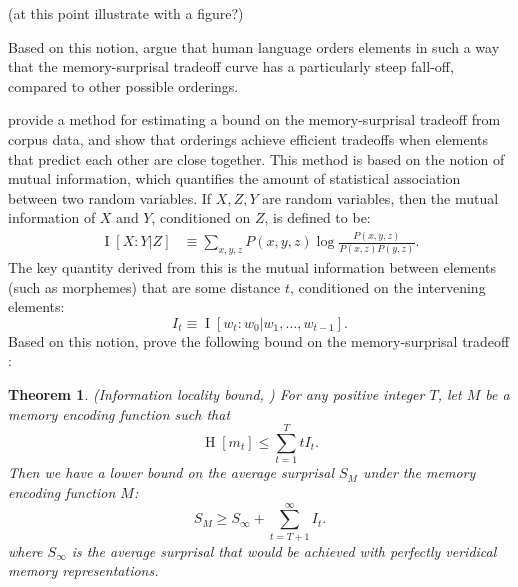 \documentclass[11pt,letterpaper]{article}
\newcommand{\citet}{\Textcite}
\newcommand\mhahn[1]{{\color{red}(#1)}}
\newcounter{theorem}
\newcounter{def}
\newtheorem{thm}[theorem]{Theorem}
\begin{document}
\mhahn{at this point illustrate with a figure?}

Based on this notion, \citet{Hahn2020modeling} argue that human language orders elements in such a way that the memory-surprisal tradeoff curve has a particularly steep fall-off, compared to other possible orderings.


\citet{Hahn2020modeling} provide a method for estimating a bound on the memory-surprisal tradeoff from corpus data, and show that orderings achieve efficient tradeoffs when elements that predict each other are close together.
This method is based on the notion of mutual information, which quantifies the amount of statistical association between two random variables.
If $X, Z, Y$ are random variables, then the mutual information of $X$ and $Y$, conditioned on $Z$, is defined to be:
\begin{align}
\label{eq:mi}
    \operatorname{I}[X:Y|Z] &\equiv \sum_{x,y,z} P(x,y,z) \log \frac{P(x,y,z)}{P(x,z)P(y,z)}. %
\end{align}
The key quantity derived from this is the mutual information between elements (such as morphemes) that are some distance $t$, conditioned on the intervening elements:
\begin{equation*}
    I_t \equiv \operatorname{I}[w_t : w_0 | w_1, \dots, w_{t-1}].
\end{equation*}
Based on this notion, \citet{Hahn2020modeling}  prove the following bound on the memory-surprisal tradeoff :
\begin{thm}\label{prop:suboptimal}(Information locality bound, \citet{Hahn2020modeling})
For any positive integer $T$, let $M$ be a memory encoding function such that
\begin{equation}
\label{eq:memory-bound}
\operatorname{H}[m_t] \le \sum_{t=1}^T t I_t.
\end{equation}
Then we have a lower bound on the average surprisal $S_M$ under the memory encoding function $M$:
\begin{equation}
\label{eq:surprisal-bound}
S_M \ge S_\infty + \sum_{t=T+1}^\infty I_t.
\end{equation}
where $S_\infty$ is the average surprisal that would be achieved with perfectly veridical memory representations.
\end{thm}
\end{document}
